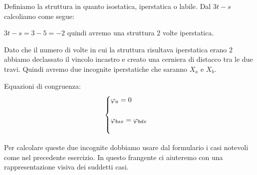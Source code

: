 \documentclass[a4paper,12pt, oneside]{book}
\begin{document}
	Definiamo la struttura in quanto isostatica, iperstatica o labile. Dal $3t-s$ calcoliamo come segue:
	
	$3t-s=3-5=-2$ quindi avremo una struttura 2 volte iperstatica.
	
	\begin{figure}[H]
		\centering
		\caption{}
		\label{fig:traveforzacazzoculomega}
	\end{figure}
	
	Dato che il numero di volte in cui la struttura risultava iperstatica erano 2 abbiamo declassato il vincolo incastro e creato una cerniera di distacco tra le due travi. Quindi avremo due incognite iperstatiche che saranno $X_a$ e $X_b$.
	
	Equazioni di congruenza:
	\begin{equation}
		\centering
		\begin{cases}
			\varphi_a=0 \\ \\
			\varphi_{bsx}=\varphi_{bdx} \\ \\
		\end{cases}
	\end{equation}
	
	Per calcolare queste due incognite dobbiamo usare dal formulario i casi notevoli come nel precedente esercizio. In questo frangente ci aiuteremo con una rappresentazione visiva dei suddetti casi.
	
\end{document}
